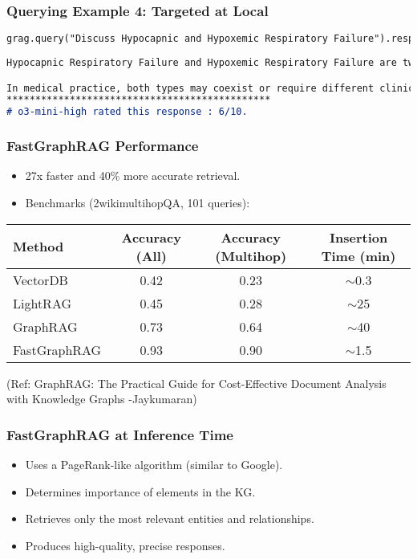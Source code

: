 \begin{frame}[fragile]\frametitle{Querying Example 4: Targeted at Local}
        \begin{lstlisting}[language=markdown]
    grag.query("Discuss Hypocapnic and Hypoxemic Respiratory Failure").response
	
Hypocapnic Respiratory Failure and Hypoxemic Respiratory Failure are two distinct categories of respiratory failure, each characterized by different clinical features. Conversely,\ldots Accurate assessment and differentiation between these conditions are crucial for appropriate management and treatment.

In medical practice, both types may coexist or require different clinical interventions based on the specific underlying pathology.
**********************************************
# o3-mini-high rated this response : 6/10.	
    \end{lstlisting}

\end{frame}


\begin{frame}[fragile]\frametitle{FastGraphRAG Performance}
    \begin{itemize}
        \item 27x faster and 40\% more accurate retrieval.
        \item Benchmarks (2wikimultihopQA, 101 queries):
    \end{itemize}

	
    \begin{tabular}{lccc}
        \hline
        Method & Accuracy (All) & Accuracy (Multihop) & Insertion Time (min) \\
        \hline
        VectorDB & 0.42 & 0.23 & $\sim$0.3 \\
        LightRAG & 0.45 & 0.28 & $\sim$25 \\
        GraphRAG & 0.73 & 0.64 & $\sim$40 \\
        FastGraphRAG & 0.93 & 0.90 & $\sim$1.5 \\
        \hline
    \end{tabular}	
	
	{\tiny (Ref: GraphRAG: The Practical Guide for Cost-Effective Document Analysis with Knowledge Graphs -Jaykumaran)}	
\end{frame}


\begin{frame}[fragile]\frametitle{FastGraphRAG at Inference Time}
    \begin{itemize}
        \item Uses a PageRank-like algorithm (similar to Google).
        \item Determines importance of elements in the KG.
        \item Retrieves only the most relevant entities and relationships.
        \item Produces high-quality, precise responses.
    \end{itemize}
\end{frame}

